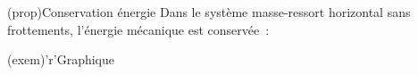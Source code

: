 \documentclass[../../main/main.tex]{subfiles}
\begin{document}
\begin{tcbraster}[raster columns=2, raster equal height=rows]
	\begin{tcb}[label=prop:emecacons](prop){Conservation énergie}
		Dans le système masse-ressort horizontal sans frottements, l'énergie
		mécanique est conservée~:
		\psw{
			\[
				\boxed{\Ec_m = \cte}
				\Lra
				\boxed{\dv{\Ec_m}{t} = 0}
			\]
		}
		\vspace{-15pt}
	\end{tcb}
	\begin{tcb}[width=\linewidth](exem)'r'{Graphique}
		\begin{center}
		\end{center}
	\end{tcb}
\end{tcbraster}
\end{document}

